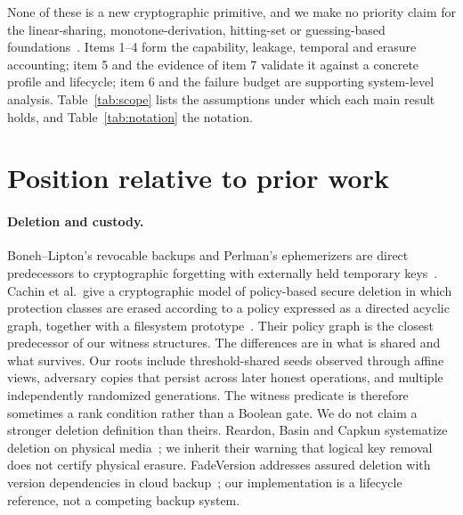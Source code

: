 \documentclass[pdflatex,sn-mathphys-num]{sn-jnl}%
\theoremstyle{plain}
\theoremstyle{definition}
\begin{document}
None of these is a new cryptographic primitive, and we make no priority claim for the linear-sharing, monotone-derivation, hitting-set or guessing-based foundations~\cite{karchmer1993,panjwani2007}. Items 1--4 form the capability, leakage, temporal and erasure accounting; item 5 and the evidence of item 7 validate it against a concrete profile and lifecycle; item 6 and the failure budget are supporting system-level analysis. Table~\ref{tab:scope} lists the assumptions under which each main result holds, and Table~\ref{tab:notation} the notation.


\section{Position relative to prior work}\label{sec:related}

\paragraph{Deletion and custody.}
Boneh--Lipton's revocable backups and Perlman's ephemerizers are direct predecessors to cryptographic forgetting with externally held temporary keys~\cite{boneh1996,perlman2007}. Cachin et al.\ give a cryptographic model of policy-based secure deletion in which protection classes are erased according to a policy expressed as a directed acyclic graph, together with a filesystem prototype~\cite{cachin2013}. Their policy graph is the closest predecessor of our witness structures. The differences are in what is shared and what survives. Our roots include threshold-shared seeds observed through affine views, adversary copies that persist across later honest operations, and multiple independently randomized generations. The witness predicate is therefore sometimes a rank condition rather than a Boolean gate. We do not claim a stronger deletion definition than theirs. Reardon, Basin and Capkun systematize deletion on physical media~\cite{reardon2013}; we inherit their warning that logical key removal does not certify physical erasure. FadeVersion addresses assured deletion with version dependencies in cloud backup~\cite{rahumed2011}; our implementation is a lifecycle reference, not a competing backup system.
\end{document}
